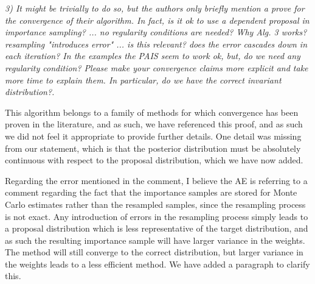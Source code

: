 \documentclass{article}
\newcommand{\comment}[2]{\vspace{0.6cm}{\bf Comment:} {\it #1.}

\vspace{0.3cm}{\bf Answer:} #2}
\begin{document}
\comment{3) It might be trivially to do so, but the authors only briefly mention a prove for the convergence of their algorithm. In fact, is it ok to use a dependent proposal in importance sampling? ... no regularity conditions are needed? Why Alg. 3 works? resampling "introduces error" ... is this relevant? does the error cascades down in each iteration? In the examples the PAIS seem to work ok, but, do we need any regularity condition? Please make your convergence claims more explicit and take more time to explain them. In particular, do we have the correct invariant distribution?}{This algorithm belongs to a family of methods for which convergence has been proven in the literature, and as such, we have referenced this proof, and as such we did not feel it appropriate to provide further details. One detail was missing from our statement, which is that the posterior distribution must be absolutely continuous with respect to the proposal distribution, which we have now added.

Regarding the error mentioned in the comment, I believe the AE is referring to a comment regarding the fact that the importance samples are stored for Monte Carlo estimates rather than the resampled samples, since the resampling process is not exact. Any introduction of errors in the resampling process simply leads to a proposal distribution which is less representative of the target distribution, and as such the resulting importance sample will have larger variance in the weights. The method will still converge to the correct distribution, but larger variance in the weights leads to a less efficient method. We have added a paragraph to clarify this.}
\end{document}
